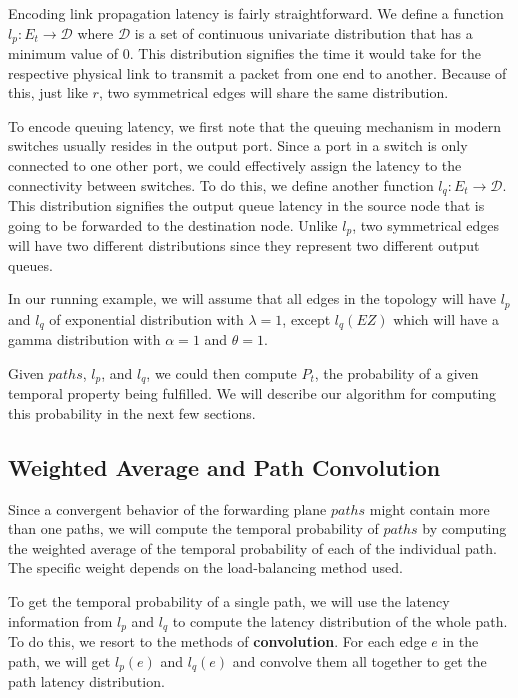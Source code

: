 \documentclass[10pt,sigconf,letterpaper,anonymous,nonacm]{acmart}
\begin{document}
Encoding link propagation latency is fairly straightforward. 
We define a function $l_p: E_t \rightarrow \mathcal{D}$ where $\mathcal{D}$ is a set of 
continuous univariate distribution that has a minimum value of $0$.
This distribution signifies the time it would take for the respective physical link to transmit 
a packet from one end to another.
Because of this, just like $r$, two symmetrical edges will share the same distribution.

To encode queuing latency, we first note that the queuing mechanism in modern switches 
usually resides in the output port. %
Since a port in a switch is only connected to one other port, we could effectively 
assign the latency to the connectivity between switches.
To do this, we define another function $l_q: E_t \rightarrow \mathcal{D}$.
This distribution signifies the output queue latency in the source node that is 
going to be forwarded to the destination node.
Unlike $l_p$, two symmetrical edges will have two different distributions since they 
represent two different output queues.

In our running example, we will assume that all edges in the topology will have $l_p$
and $l_q$ of exponential distribution with $\lambda = 1$, except $l_q(EZ)$ which will 
have a gamma distribution with $\alpha = 1$ and $\theta = 1$.

Given $paths$, $l_p$, and $l_q$, we could then compute $P_t$, the probability of a 
given temporal property being fulfilled.
We will describe our algorithm for computing this probability in the next few 
sections.

\subsection{Weighted Average and Path Convolution}
Since a convergent behavior of the forwarding plane $paths$ might contain more than 
one paths, we will compute the temporal probability of $paths$ by computing the 
weighted average of the temporal probability of each of the individual path.
The specific weight depends on the load-balancing method used.

To get the temporal probability of a single path, we will use the latency information 
from $l_p$ and $l_q$ to compute the latency distribution of the whole path.
To do this, we resort to the methods of \textbf{convolution}.
For each edge $e$ in the path, we will get $l_p(e)$ and $l_q(e)$ and convolve them 
all together to get the path latency distribution.
\end{document}
